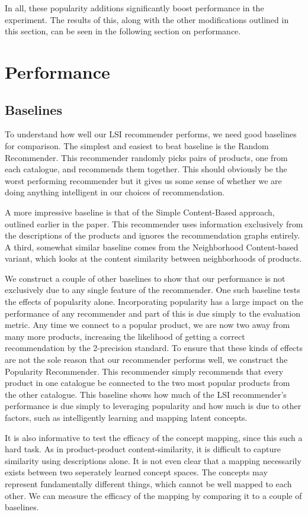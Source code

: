 \documentclass[11pt]{article}
\begin{document}
In all, these popularity additions significantly boost performance in the
experiment. The results of this, along with the other modifications outlined in
this section, can be seen in the following section on performance.

\section*{Performance}
\subsection*{Baselines}
To understand how well our LSI recommender performs, we need good baselines
for comparison.  The simplest and easiest to beat baseline is the Random 
Recommender. This recommender randomly picks pairs of products, one from 
each catalogue, and recommends them together. This should obviously be the 
worst performing recommender but it gives us some sense of whether we are 
doing anything intelligent in our choices of recommendation.

A more impressive baseline is that of the Simple Content-Based approach, 
outlined earlier in the paper. This recommender uses information exclusively
from the descriptions of the products and ignores the recommendation graphs 
entirely. A third, somewhat similar baseline comes from the Neighborhood 
Content-based variant, which looks at the content similarity between 
neighborhoods of products.

We construct a couple of other baselines to show that our performance is not
exclusively due to any single feature of the recommender. One such baseline
tests the effects of popularity alone. Incorporating popularity has a large 
impact on the performance of any recommender and part of this is due simply 
to the evaluation metric. Any time we connect to a popular product, we are 
now two away from many more products, increasing the likelihood of getting a
correct recommendation by the 2-precision standard. To ensure that these kinds 
of effects are not the sole reason that our recommender performs well, 
we construct the Popularity Recommender. This recommender simply recommends 
that every product in one catalogue be connected to the two most popular 
products from the other catalogue. This baseline shows how much of the LSI 
recommender's performance is due simply to leveraging popularity and how 
much is due to other factors, such as intelligently learning and mapping 
latent concepts.

It is also informative to test the efficacy of the concept mapping, since this
such a hard task. As in product-product content-similarity, it is difficult to
capture similarity using descriptions alone. It is not even clear that a mapping 
necessarily exists between two seperately learned concept spaces. The concepts 
may represent fundamentally different things, which cannot be well mapped to 
each other. We can measure the efficacy of the mapping by comparing it to a 
couple of baselines. 
\end{document}
